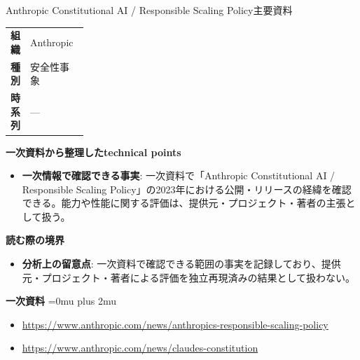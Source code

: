 \begin{technicalnote}{Anthropic Constitutional AI / Responsible Scaling Policy}{主要資料}
\begingroup
\begin{tabularx}{\linewidth}{@{}>{\bfseries}p{0.22\linewidth}X@{}}
組織 & Anthropic \\
種別 & 安全性事象 \\
時系列 & — \\
\end{tabularx}
\smallskip
{\bfseries 一次資料から整理したtechnical points}
\begin{itemize}[leftmargin=1.5em,itemsep=0.35em]
\item \textbf{一次情報で確認できる事実}: 一次資料で「Anthropic Constitutional AI / Responsible Scaling Policy」の2023年における公開・リリースの経緯を確認できる。能力や性能に関する評価は、提供元・プロジェクト・著者の主張として扱う。
\end{itemize}
\begin{minipage}{\linewidth}
{\bfseries 読む際の境界}
\begin{itemize}[leftmargin=1.5em,itemsep=0.35em]
\item \textbf{分析上の留意点}: 一次資料で確認できる範囲の事実を記録しており、提供元・プロジェクト・著者による評価を独立再現済みの結果として扱わない。
\end{itemize}
\begin{samepage}
{\bfseries 一次資料}
\begingroup\sloppy
\Urlmuskip=0mu plus 2mu\relax
\begin{itemize}[leftmargin=1.5em,itemsep=0.25em]
\item {\scriptsize\url{https://www.anthropic.com/news/anthropics-responsible-scaling-policy}}
\item {\scriptsize\url{https://www.anthropic.com/news/claudes-constitution}}
\end{itemize}
\endgroup
\end{samepage}
\end{minipage}
\endgroup
\end{technicalnote}
\medskip

